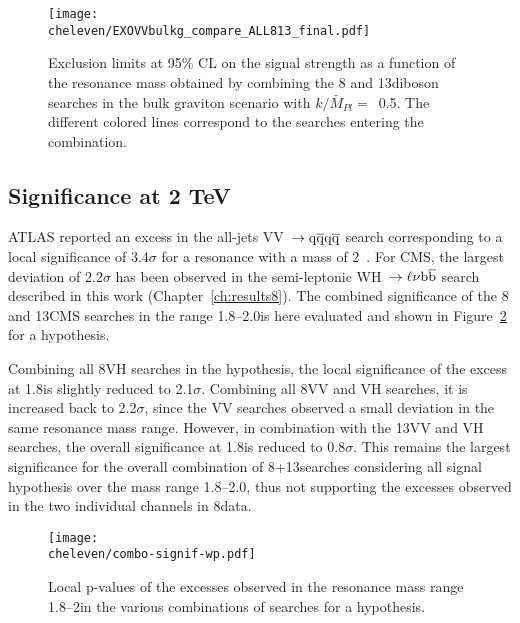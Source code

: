 \begin{figure}[!htb]
\centering
\texttt{[image: \\cheleven/EXOVVbulkg\_compare\_ALL813\_final.pdf]}
\caption{
Exclusion limits at 95\% CL on the signal strength as a function of the resonance mass obtained by combining the 8 and 13\TeV diboson searches in the bulk graviton scenario with $k/\bar{M}_{Pl}=$~0.5. The different colored lines correspond to the searches entering the combination.}
\label{fig:bulkgall_138TeV}
\end{figure}

\subsection{Significance at 2 TeV}

ATLAS reported an excess in the all-jets VV~$\to\mathrm{q}\overline{\mathrm{q}}\mathrm{q}\overline{\mathrm{q}}$ search corresponding to a local significance of 3.4$\sigma$ for a \Wpr resonance with a mass of 2\TeV~\cite{Aad:2015owa}.
For CMS, the largest deviation of 2.2$\sigma$ has been observed in the semi-leptonic WH~$\to \ell \nu {\mathrm{b}\overline{\mathrm{b}}}$ search described in this work (Chapter~\ref{ch:results8}).
The combined significance of the 8 and 13\TeV CMS searches in the range 1.8--2.0\TeV is here evaluated and shown in Figure~\ref{fig:comboSignif} for a \Wpr hypothesis.

Combining all 8\TeV VH searches in the \Wpr hypothesis, the local significance of the excess at 1.8\TeV is slightly reduced to 2.1$\sigma$.
Combining all 8\TeV VV and VH searches, it is increased back to 2.2$\sigma$, since the VV searches observed a small deviation in the same resonance mass range.
However, in combination with the 13\TeV VV and VH searches, the overall significance at 1.8\TeV is reduced to 0.8$\sigma$.
This remains the largest significance for the overall combination of 8+13\TeV searches considering all signal hypothesis over the mass range 1.8--2.0\TeV,
thus not supporting the excesses observed in the two individual channels in 8\TeV data.

\begin{figure}[!htb]
\centering
\texttt{[image: \\cheleven/combo-signif-wp.pdf]}
\caption{Local p-values of the excesses observed in the resonance mass range 1.8--2\TeV in the various combinations of searches for a \Wpr hypothesis.}
\label{fig:comboSignif}
\end{figure}

